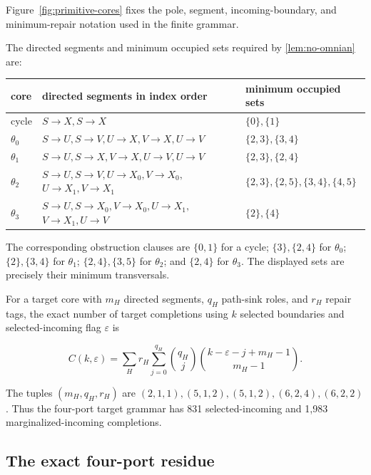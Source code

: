 

Figure~\ref{fig:primitive-cores} fixes the pole, segment, incoming-boundary,
and minimum-repair notation used in the finite grammar.

The directed segments and minimum occupied sets required by
\cref{lem:no-omnian} are:

\begin{center}
\small
\begin{tabular}{lll}
\toprule
core & directed segments in index order & minimum occupied sets\\
\midrule
cycle & \(S\to X,S\to X\) & \(\{0\},\{1\}\)\\
\(\theta_0\) & \(S\to U,S\to V,U\to X,V\to X,U\to V\)
 & \(\{2,3\},\{3,4\}\)\\
\(\theta_1\) & \(S\to U,S\to X,V\to X,U\to V,U\to V\)
 & \(\{2,3\},\{2,4\}\)\\
\(\theta_2\) & \(S\to U,S\to V,U\to X_0,V\to X_0,\)
 \(U\to X_1,V\to X_1\)
 & \(\{2,3\},\{2,5\},\{3,4\},\{4,5\}\)\\
\(\theta_3\) & \(S\to U,S\to X_0,V\to X_0,U\to X_1,\)
 \(V\to X_1,U\to V\)
 & \(\{2\},\{4\}\)\\
\bottomrule
\end{tabular}
\end{center}

The corresponding obstruction clauses are
\(\{0,1\}\) for a cycle; \(\{3\},\{2,4\}\) for \(\theta_0\);
\(\{2\},\{3,4\}\) for \(\theta_1\);
\(\{2,4\},\{3,5\}\) for \(\theta_2\); and \(\{2,4\}\) for
\(\theta_3\).  The displayed sets are precisely their minimum transversals.

For a target core with \(m_H\) directed segments, \(q_H\) path-sink roles,
and \(r_H\) repair tags, the exact number of target completions using \(k\)
selected boundaries and selected-incoming flag \(\varepsilon\) is

\begin{equation}\label{eq:completion-count}
 C(k,\varepsilon)=\sum_H r_H\sum_{j=0}^{q_H}
 \binom{q_H}{j}
 \binom{k-\varepsilon-j+m_H-1}{m_H-1}.
\end{equation}

The tuples \((m_H,q_H,r_H)\) are
\((2,1,1),(5,1,2),(5,1,2),(6,2,4),(6,2,2)\).  Thus the four-port target
grammar has 831 selected-incoming and 1,983 marginalized-incoming
completions.

\subsection{The exact four-port residue}

